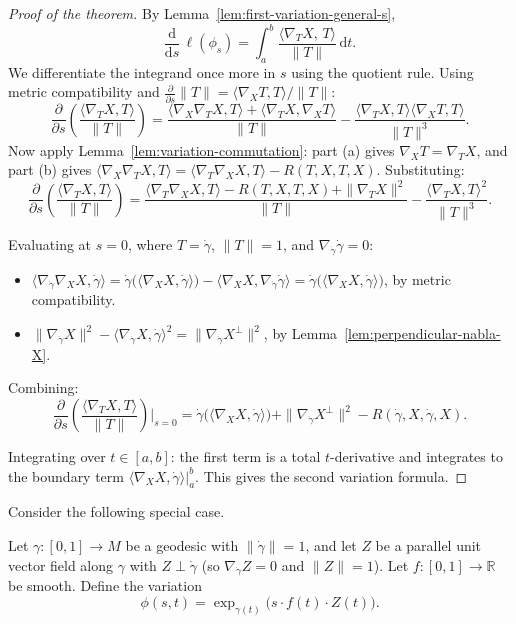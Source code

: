 \begin{proof}[Proof of the theorem]
By Lemma~\ref{lem:first-variation-general-s},
\[
\frac{\mathrm{d}}{\mathrm{d}s}\,\ell(\phi_s) = \int_a^b \frac{\langle \nabla_T X,\, T\rangle}{\|T\|}\,\mathrm{d}t.
\]
We differentiate the integrand once more in $s$ using the quotient rule. Using metric compatibility and $\frac{\partial}{\partial s}\|T\| = \langle \nabla_X T, T\rangle / \|T\|$:
\[
\frac{\partial}{\partial s}\!\left(\frac{\langle \nabla_T X, T\rangle}{\|T\|}\right) = \frac{\langle \nabla_X \nabla_T X, T\rangle + \langle \nabla_T X, \nabla_X T\rangle}{\|T\|} - \frac{\langle \nabla_T X, T\rangle \langle \nabla_X T, T\rangle}{\|T\|^3}.
\]
Now apply Lemma~\ref{lem:variation-commutation}: part (a) gives $\nabla_X T = \nabla_T X$, and part (b) gives $\langle \nabla_X \nabla_T X, T\rangle = \langle \nabla_T \nabla_X X, T\rangle - R(T, X, T, X)$. Substituting:
\[
\frac{\partial}{\partial s}\!\left(\frac{\langle \nabla_T X, T\rangle}{\|T\|}\right) = \frac{\langle \nabla_T \nabla_X X, T\rangle - R(T, X, T, X) + \|\nabla_T X\|^2}{\|T\|} - \frac{\langle \nabla_T X, T\rangle^2}{\|T\|^3}.
\]

Evaluating at $s = 0$, where $T = \dot\gamma$, $\|T\| = 1$, and $\nabla_{\dot\gamma}\dot\gamma = 0$:
\begin{itemize}
    \item $\langle \nabla_{\dot\gamma}\nabla_X X, \dot\gamma\rangle = \dot\gamma\big(\langle \nabla_X X, \dot\gamma\rangle\big) - \langle \nabla_X X, \nabla_{\dot\gamma}\dot\gamma\rangle = \dot\gamma\big(\langle \nabla_X X, \dot\gamma\rangle\big)$, by metric compatibility.
    \item $\|\nabla_{\dot\gamma} X\|^2 - \langle \nabla_{\dot\gamma} X, \dot\gamma\rangle^2 = \|\nabla_{\dot\gamma} X^\perp\|^2$, by Lemma~\ref{lem:perpendicular-nabla-X}.
\end{itemize}
Combining:
\[
\frac{\partial}{\partial s}\!\left(\frac{\langle \nabla_T X, T\rangle}{\|T\|}\right)\bigg|_{s=0} = \dot\gamma\big(\langle \nabla_X X, \dot\gamma\rangle\big) + \|\nabla_{\dot\gamma} X^\perp\|^2 - R(\dot\gamma, X, \dot\gamma, X).
\]

Integrating over $t \in [a, b]$: the first term is a total $t$-derivative and integrates to the boundary term $\langle \nabla_X X, \dot\gamma\rangle\big|_a^b$. This gives the second variation formula.
\end{proof}


Consider the following special case.

Let $\gamma \colon [0, 1] \to M$ be a geodesic with $\|\dot\gamma\| = 1$, and let $Z$ be a parallel unit vector field along $\gamma$ with $Z \perp \dot\gamma$ (so $\nabla_{\dot\gamma} Z = 0$ and $\|Z\| = 1$). Let $f \colon [0, 1] \to \mathbb{R}$ be smooth. Define the variation
\[
\phi(s, t) = \exp_{\gamma(t)}\!\big(s \cdot f(t) \cdot Z(t)\big).
\]

